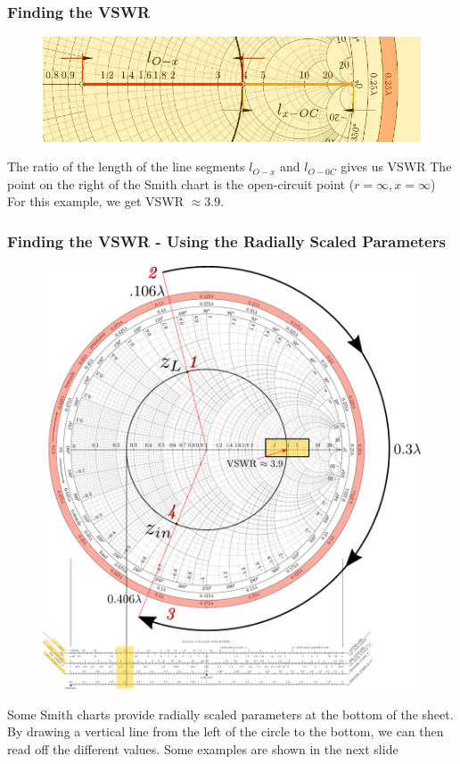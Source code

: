 \documentclass[10pt, compress]{beamer}
\begin{document}
\begin{frame}
    \frametitle{Finding the VSWR}
    \begin{figure}[T!]
        \centering
        \includegraphics[width=.95\textwidth]{smith example VSWR cropped.pdf}
    \end{figure}
    \begin{outline}
        \1 The ratio of the length of the line segments $l_{O - x}$ and $l_{O - 0C}$ gives us VSWR
        \1 The point on the right of the Smith chart is the open-circuit point ($r = \infty, x = \infty$)
        \1 For this example, we get VSWR $\approx 3.9$.
    \end{outline}

\end{frame}

\begin{frame}
    \frametitle{Finding the VSWR - Using the Radially Scaled Parameters}
    \begin{figure}[T!]
        \centering
        \includegraphics[width=.50\textwidth]{smith example VSWR2.pdf}
    \end{figure}
    \begin{outline}
        \1 Some Smith charts provide radially scaled parameters at the bottom of the sheet.
        \1 By drawing a vertical line from the left of the circle to the bottom, we can then read off the different values.
        \1 Some examples are shown in the next slide
    \end{outline}
\end{frame}
\end{document}
